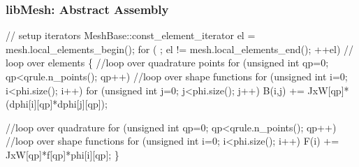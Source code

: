 \documentclass{beamer}
\begin{document}
\begin{frame}[fragile]
\frametitle{libMesh: Abstract Assembly}
\begin{semiverbatim}
\scriptsize
// setup iterators
MeshBase::const_element_iterator    
          el     = mesh.local_elements_begin();
for ( ; el != mesh.local_elements_end(); ++el) // loop over elements
 \{
  //loop over quadrature points
  for (unsigned int qp=0; qp<qrule.n_points(); qp++)
   //loop over shape functions
   for (unsigned int i=0; i<phi.size(); i++)
     for (unsigned int j=0; j<phi.size(); j++)
       B(i,j) += JxW[qp]*(dphi[i][qp]*dphi[j][qp]);

  //loop over quadrature
  for (unsigned int qp=0; qp<qrule.n_points(); qp++)
    //loop over shape functions
    for (unsigned int i=0; i<phi.size(); i++) 
       F(i) += JxW[qp]*f[qp]*phi[i][qp];
 \}
\end{semiverbatim}
\end{frame}
\end{document}
